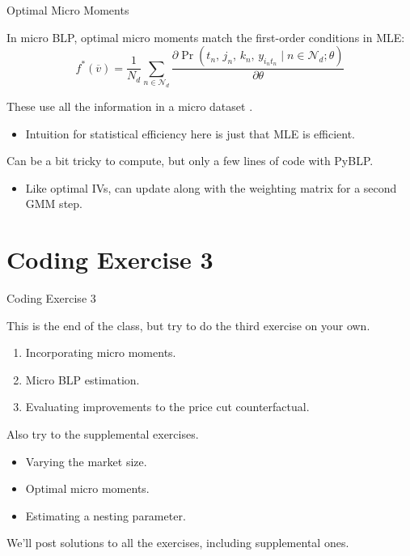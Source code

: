 \documentclass[aspectratio=169,t,11pt,table]{beamer}
\begin{document}
\begin{frame}{Optimal Micro Moments}
    \begin{wideitemize}
        \item In micro BLP, \alert{optimal micro moments} match the first-order conditions in MLE:
        \begin{equation*}
            f^*(\overline{v}) = \frac{1}{N_d} \sum_{n \in \mathcal{N}_d} \frac{\partial\Pr(t_n, \, j_n, \, k_n, \, y_{i_nt_n} \mid n \in \mathcal{N}_d; \theta)}{\partial\theta}
        \end{equation*}
        \vspace{-\baselineskip}
        \pause
        \item These use all the information in a micro dataset \citep{conlon2023incorporating}.
        \begin{itemize}
            \item Intuition for statistical efficiency here is just that MLE is efficient.
        \end{itemize}
        \pause
        \item Can be a bit tricky to compute, but only a few lines of code with PyBLP.
        \begin{itemize}
            \item Like optimal IVs, can update along with the weighting matrix for a second GMM step.
        \end{itemize}
    \end{wideitemize}
\end{frame}

\section{Coding Exercise 3}

\begin{frame}{Coding Exercise 3}
    \begin{wideitemize}
        \item This is the end of the class, but try to do the third exercise on your own.
        \begin{enumerate}
            \item Incorporating micro moments.
            \item Micro BLP estimation.
            \item Evaluating improvements to the price cut counterfactual.
        \end{enumerate}
        \pause
        \item Also try to the supplemental exercises.
        \begin{itemize}
            \item Varying the market size.
            \item Optimal micro moments.
            \item Estimating a nesting parameter.
        \end{itemize}
        \pause
        \item We'll post solutions to all the exercises, including supplemental ones.
    \end{wideitemize}
\end{frame}
\end{document}
